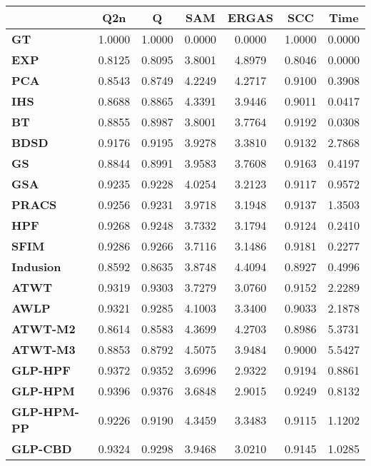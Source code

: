 \begin{tabular}{|l|c|c|c|c|c|c|}
\hline
&\textbf{Q2n}&\textbf{Q}&\textbf{SAM}&\textbf{ERGAS}&\textbf{SCC}&\textbf{Time}\\\hline
\textbf{GT}&1.0000&1.0000&0.0000&0.0000&1.0000&0.0000\\\hline
\textbf{EXP}&0.8125&0.8095&3.8001&4.8979&0.8046&0.0000\\\hline
\textbf{PCA}&0.8543&0.8749&4.2249&4.2717&0.9100&0.3908\\\hline
\textbf{IHS}&0.8688&0.8865&4.3391&3.9446&0.9011&0.0417\\\hline
\textbf{BT}&0.8855&0.8987&3.8001&3.7764&0.9192&0.0308\\\hline
\textbf{BDSD}&0.9176&0.9195&3.9278&3.3810&0.9132&2.7868\\\hline
\textbf{GS}&0.8844&0.8991&3.9583&3.7608&0.9163&0.4197\\\hline
\textbf{GSA}&0.9235&0.9228&4.0254&3.2123&0.9117&0.9572\\\hline
\textbf{PRACS}&0.9256&0.9231&3.9718&3.1948&0.9137&1.3503\\\hline
\textbf{HPF}&0.9268&0.9248&3.7332&3.1794&0.9124&0.2410\\\hline
\textbf{SFIM}&0.9286&0.9266&3.7116&3.1486&0.9181&0.2277\\\hline
\textbf{Indusion}&0.8592&0.8635&3.8748&4.4094&0.8927&0.4996\\\hline
\textbf{ATWT}&0.9319&0.9303&3.7279&3.0760&0.9152&2.2289\\\hline
\textbf{AWLP}&0.9321&0.9285&4.1003&3.3400&0.9033&2.1878\\\hline
\textbf{ATWT-M2}&0.8614&0.8583&4.3699&4.2703&0.8986&5.3731\\\hline
\textbf{ATWT-M3}&0.8853&0.8792&4.5075&3.9484&0.9000&5.5427\\\hline
\textbf{GLP-HPF}&0.9372&0.9352&3.6996&2.9322&0.9194&0.8861\\\hline
\textbf{GLP-HPM}&0.9396&0.9376&3.6848&2.9015&0.9249&0.8132\\\hline
\textbf{GLP-HPM-PP}&0.9226&0.9190&4.3459&3.3483&0.9115&1.1202\\\hline
\textbf{GLP-CBD}&0.9324&0.9298&3.9468&3.0210&0.9145&1.0285\\\hline
\end{tabular}
